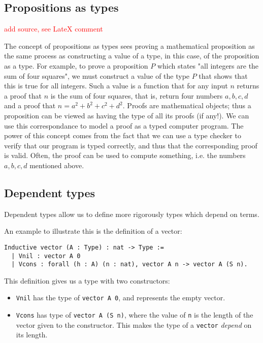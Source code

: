 \subsection{Propositions as types}

\textcolor{red}{add source, see LateX comment}

The concept of propositions as types sees proving a mathematical proposition
as the same process as constructing a value of a type, in this case,
of the proposition as a type.
For example, to prove a proposition $P$ which states "all integers are the sum of four squares",
we must construct a value of the type $P$ that shows that this is true for all integers.
Such a value is a function that for any input $n$ returns a proof that $n$ is the sum of four squares,
that is, return four numbers $a, b, c, d$ and a proof that $n = a^2 + b^2 + c^2 + d^2$.
Proofs are mathematical objects; thus a proposition can be viewed as having the type of all its proofs (if any!).
We can use this correspondance to model a proof as a typed computer program.
The power of this concept comes from the fact that we can use a type checker to verify that
our program is typed correctly, and thus that the corresponding proof is valid.
Often, the proof can be used to compute something, i.e. the numbers $a, b, c, d$ mentioned above.

\subsection{Dependent types}

Dependent types allow us to define more rigorously types which depend on terms.

An example to illustrate this is the definition of a vector:

\begin{minipage}{\linewidth}
\begin{lstlisting}[language=Coq, label={lst:dep_type_vec}, caption={\lstinline{vector} in Coq, using dependent types}]
Inductive vector (A : Type) : nat -> Type :=
  | Vnil : vector A 0
  | Vcons : forall (h : A) (n : nat), vector A n -> vector A (S n).
\end{lstlisting}
\end{minipage}

This definition gives us a type with two constructors:

\begin{itemize}
    \item
        \lstinline{Vnil} has the type of \lstinline{vector A 0}, and represents the empty vector.
    \item
        \lstinline{Vcons} has type of \lstinline{vector A (S n)}, where the value of \lstinline{n}
                            is the length of the vector given to the constructor.
                            This makes the type of a \lstinline{vector} \textit{depend} on its length.
\end{itemize}

